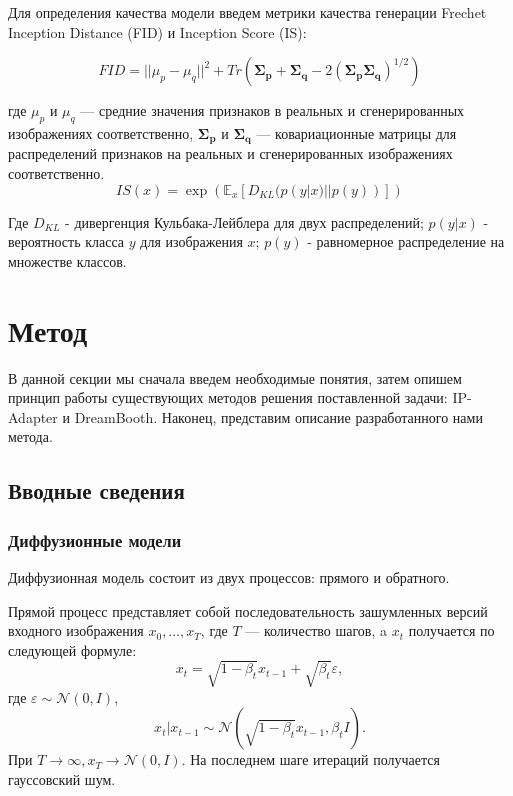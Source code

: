 \documentclass{article}
\begin{document}
Для определения качества модели введем метрики качества генерации Frechet Inception Distance (FID) и Inception Score (IS): 

\begin{equation}
FID = ||\mu_p - \mu_q||^2 + Tr(\mathbf{\Sigma_p} + \mathbf{\Sigma_q} - 2(\mathbf{\Sigma_p}\mathbf{\Sigma_q})^{1/2})
\end{equation}

где \( \mu_p \) и \( \mu_q \) --- средние значения признаков в реальных и сгенерированных изображениях соответственно, \( \mathbf{\Sigma_p} \) и \( \mathbf{\Sigma_q} \) --- ковариационные матрицы для распределений признаков на реальных и сгенерированных изображениях соответственно.
\begin{equation}
IS(x) = \exp(\mathbb{E}_x \left[ D_{KL}(p(y | x) || p(y)) \right] )
\end{equation}

Где \( D_{KL} \) - дивергенция Кульбака-Лейблера для двух распределений; \(p(y|x)\) - вероятность класса \(y\) для изображения \(x\); \(p(y)\) - равномерное распределение на множестве классов.

\section{Метод}
В данной секции мы сначала введем необходимые понятия, затем опишем принцип работы существующих методов решения поставленной задачи: IP-Adapter и DreamBooth. Наконец, представим описание разработанного нами метода.
\subsection{Вводные сведения}
\subsubsection{Диффузионные модели}
Диффузионная модель состоит из двух процессов: прямого и обратного.

Прямой процесс представляет собой последовательность зашумленных версий входного изображения $x_0, \dots, x_T$, где $T$ --- количество шагов, a $x_t$ получается по следующей формуле: 
\begin{equation}
x_t = \sqrt{1-\beta_t}x_{t-1}+\sqrt{\beta_t}\varepsilon,
\end{equation}
где $\varepsilon \sim \mathcal{N}(0, I)$, 
\begin{equation}
x_t|x_{t-1} \sim \mathcal{N}(\sqrt{1-\beta_t}x_{t-1}, \beta_t I).
\end{equation}
При $T \rightarrow \infty, x_T \rightarrow \mathcal{N}(0, I).$ На последнем шаге итераций получается гауссовский шум. 
\end{document}
